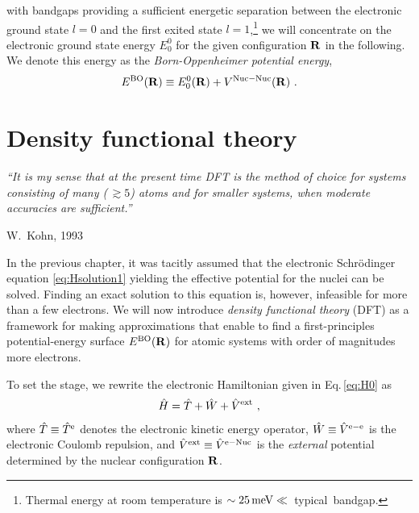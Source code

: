  with bandgaps providing a sufficient energetic separation between the electronic ground state $l=0$ and the first exited state $l=1$,\footnote{Thermal energy at room temperature is \mbox{$\sim 25\,{\rm meV} \ll $~typical bandgap}.} we will concentrate on the electronic ground state energy $E^0_0$ for the given configuration ${\bf R}$ in the following. We denote this energy as the \emph{Born-Oppenheimer potential energy},
\begin{align}
	E^{\rm BO} ({\bf R}) \equiv E^0_0 ({\bf R}) + V^{\mathrm{Nuc}-\mathrm{Nuc}} ({\bf R})~.
	\label{eq:E^BO_0}
\end{align}

\newpage
\section{Density functional theory}
\epigraph{\singlespacing \it ``It is my sense that at the present time DFT is the method of choice for systems consisting of many (\,$\gtrsim 5$) atoms and for smaller systems, when moderate accuracies are sufficient.''}{W.~Kohn, 1993}

In the previous chapter, it was tacitly assumed that the electronic Schr\"odinger equation \eqref{eq:Hsolution1} yielding the effective potential for the nuclei can be solved. Finding an exact solution to this equation is, however, infeasible for more than a few electrons. We will now introduce \emph{density functional theory} (DFT) as a framework for making approximations that enable to find a first-principles potential-energy surface $E^{\rm BO} ({\bf R})$ for atomic systems with order of magnitudes more electrons.

To set the stage, we rewrite the electronic Hamiltonian given in Eq.\,\eqref{eq:H0} as
\begin{align}
	\hat H = \hat T + \hat W + \hat V^{\rm ext}~,
	\label{eq:H.dft.1}
\end{align}
where $\hat T \equiv \hat T^{\rm e}$ denotes the electronic kinetic energy operator, $\hat W \equiv \hat V^{\rm e-e}$ is the electronic Coulomb repulsion, and $\hat V^{\rm ext} \equiv \hat V^{\rm e-Nuc}$ is the \emph{external} potential determined by the nuclear configuration $\bf R$. 

